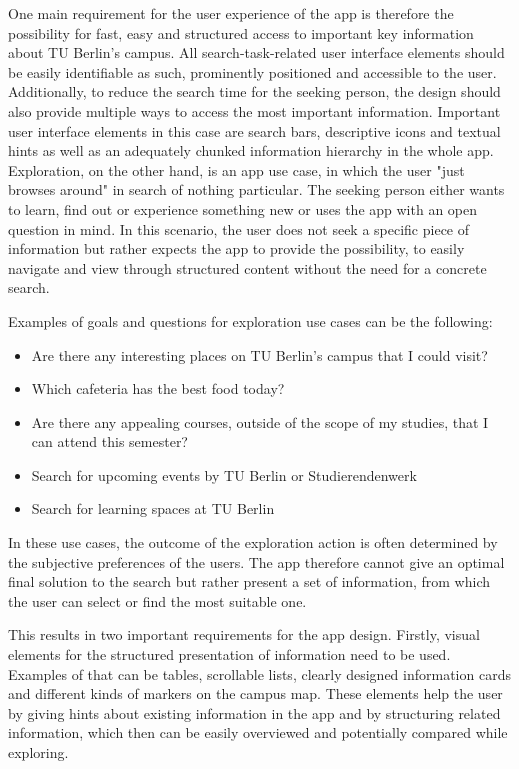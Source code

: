 One main requirement for the user experience of the app is therefore the possibility for fast, easy and structured access to important key information about TU Berlin's campus. All search-task-related user interface elements should be easily identifiable as such, prominently positioned and accessible to the user. Additionally, to reduce the search time for the seeking person, the design should also provide multiple ways to access the most important information. Important user interface elements in this case are search bars, descriptive icons and textual hints as well as an adequately chunked information hierarchy in the whole app.\\

Exploration, on the other hand, is an app use case, in which the user "just browses around" in search of nothing particular. The seeking person either wants to learn, find out or experience something new or uses the app with an open question in mind. In this scenario, the user does not seek a specific piece of information but rather expects the app to provide the possibility, to easily navigate and view through structured content without the need for a concrete search.

Examples of goals and questions for exploration use cases can be the following:

\begin{itemize}
    \item Are there any interesting places on TU Berlin's campus that I could visit?
    \item Which cafeteria has the best food today?
    \item Are there any appealing courses, outside of the scope of my studies, that I can attend this semester?
    \item Search for upcoming events by TU Berlin or Studierendenwerk
    \item Search for learning spaces at TU Berlin
\end{itemize}

In these use cases, the outcome of the exploration action is often determined by the subjective preferences of the users. The app therefore cannot give an optimal final solution to the search but rather present a set of information, from which the user can select or find the most suitable one.

This results in two important requirements for the app design. Firstly, visual elements for the structured presentation of information need to be used. Examples of that can be tables, scrollable lists, clearly designed information cards and different kinds of markers on the campus map. These elements help the user by giving hints about existing information in the app and by structuring related information, which then can be easily overviewed and potentially compared while exploring.

